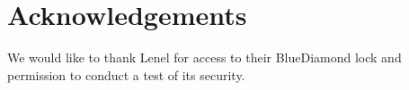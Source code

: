 \documentclass[10pt,twocolumn,letterpaper]{article}
\begin{document}
\section{Acknowledgements}
We would like to thank Lenel for access to their BlueDiamond lock and permission to conduct a test of its security. 




\end{document}

